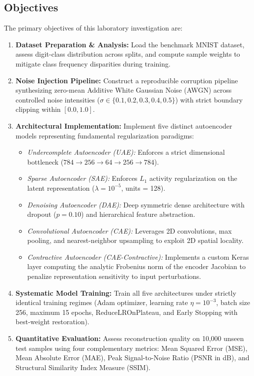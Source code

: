\documentclass[12pt, a4paper]{article}
\begin{document}
\subsection{Objectives}
The primary objectives of this laboratory investigation are:
\begin{enumerate}[label=\textbf{\arabic*.}]
    \item \textbf{Dataset Preparation \& Analysis:} Load the benchmark MNIST dataset, assess digit-class distribution across splits, and compute sample weights to mitigate class frequency disparities during training.
    \item \textbf{Noise Injection Pipeline:} Construct a reproducible corruption pipeline synthesizing zero-mean Additive White Gaussian Noise (AWGN) across controlled noise intensities ($\sigma \in \{0.1, 0.2, 0.3, 0.4, 0.5\}$) with strict boundary clipping within $[0.0, 1.0]$.
    \item \textbf{Architectural Implementation:} Implement five distinct autoencoder models representing fundamental regularization paradigms:
    \begin{itemize}[noitemsep]
        \item \textit{Undercomplete Autoencoder (UAE):} Enforces a strict dimensional bottleneck ($784 \to 256 \to 64 \to 256 \to 784$).
        \item \textit{Sparse Autoencoder (SAE):} Enforces $L_1$ activity regularization on the latent representation ($\lambda = 10^{-5}$, units = 128).
        \item \textit{Denoising Autoencoder (DAE):} Deep symmetric dense architecture with dropout ($p = 0.10$) and hierarchical feature abstraction.
        \item \textit{Convolutional Autoencoder (CAE):} Leverages 2D convolutions, max pooling, and nearest-neighbor upsampling to exploit 2D spatial locality.
        \item \textit{Contractive Autoencoder (CAE-Contractive):} Implements a custom Keras layer computing the analytic Frobenius norm of the encoder Jacobian to penalize representation sensitivity to input perturbations.
    \end{itemize}
    \item \textbf{Systematic Model Training:} Train all five architectures under strictly identical training regimes (Adam optimizer, learning rate $\eta = 10^{-3}$, batch size 256, maximum 15 epochs, ReduceLROnPlateau, and Early Stopping with best-weight restoration).
    \item \textbf{Quantitative Evaluation:} Assess reconstruction quality on 10,000 unseen test samples using four complementary metrics: Mean Squared Error (MSE), Mean Absolute Error (MAE), Peak Signal-to-Noise Ratio (PSNR in dB), and Structural Similarity Index Measure (SSIM).

\end{enumerate}
\end{document}
